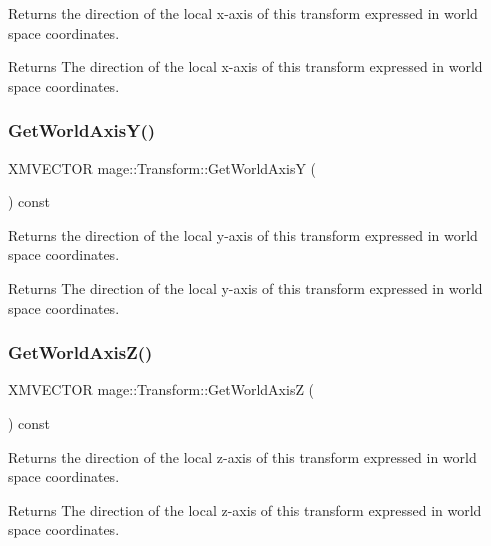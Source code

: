 Returns the direction of the local x-\/axis of this transform expressed in world space coordinates.

\begin{DoxyReturn}{Returns}
The direction of the local x-\/axis of this transform expressed in world space coordinates. 
\end{DoxyReturn}
\hypertarget{structmage_1_1_transform_a9c4452fa4aefb48e4e6c9a4a38fac32c}{}\label{structmage_1_1_transform_a9c4452fa4aefb48e4e6c9a4a38fac32c} 
\subsubsection{\texorpdfstring{Get\+World\+Axis\+Y()}{GetWorldAxisY()}}
{\footnotesize\ttfamily X\+M\+V\+E\+C\+T\+OR mage\+::\+Transform\+::\+Get\+World\+AxisY (\begin{DoxyParamCaption}{ }\end{DoxyParamCaption}) const}

Returns the direction of the local y-\/axis of this transform expressed in world space coordinates.

\begin{DoxyReturn}{Returns}
The direction of the local y-\/axis of this transform expressed in world space coordinates. 
\end{DoxyReturn}
\hypertarget{structmage_1_1_transform_a580b65d46b4af8086fab60d0737fd353}{}\label{structmage_1_1_transform_a580b65d46b4af8086fab60d0737fd353} 
\subsubsection{\texorpdfstring{Get\+World\+Axis\+Z()}{GetWorldAxisZ()}}
{\footnotesize\ttfamily X\+M\+V\+E\+C\+T\+OR mage\+::\+Transform\+::\+Get\+World\+AxisZ (\begin{DoxyParamCaption}{ }\end{DoxyParamCaption}) const}

Returns the direction of the local z-\/axis of this transform expressed in world space coordinates.

\begin{DoxyReturn}{Returns}
The direction of the local z-\/axis of this transform expressed in world space coordinates. 
\end{DoxyReturn}
\hypertarget{structmage_1_1_transform_a809600adbb284334d444ae8c50b17a1d}{}\label{structmage_1_1_transform_a809600adbb284334d444ae8c50b17a1d} 

